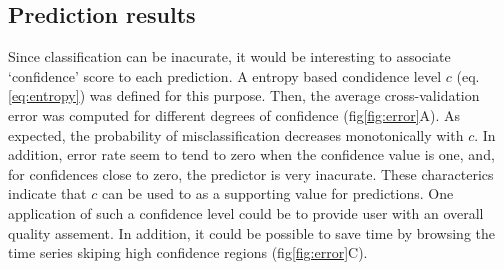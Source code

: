 \subsection{Prediction results}
Since classification can be inacurate, it would be interesting to associate `confidence' score to each prediction.
A entropy based condidence level $c$ (eq. \ref{eq:entropy}) was defined for this purpose.
Then, the average cross-validation error was computed for different degrees of confidence (fig\ref{fig:error}A).
As expected, the probability of misclassification decreases monotonically with $c$.
In addition, error rate seem to tend to zero when the confidence value is one, and, for confidences close to zero, the predictor is very inacurate.
These characterics indicate that $c$ can be used to as a supporting value for predictions.
One application of such a confidence level could be to provide user with an overall quality assement. In addition,
it could be possible to save time by browsing the time series skiping high confidence regions (fig\ref{fig:error}C).





